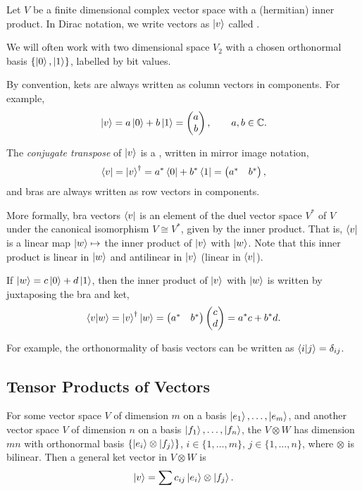 \documentclass[a4paper]{article}
\begin{document}
Let $V$ be a finite dimensional complex vector space with a (hermitian) inner product. In Dirac notation, we write vectors as 
$\ket{v}$ called . 

We will often work with two dimensional space $V_2$ with a chosen orthonormal basis $\{\ket{0}, \ket{1}\}$, labelled by bit values.

By convention, kets are always written as column vectors in components. For example,
$$
\ket{v} = a \ket{0} + b\ket{1} = \begin{pmatrix}
	a \\ b
\end{pmatrix}, \quad \quad a, b\in \mathbb{C}.
$$

The \emph{conjugate transpose} of $\ket{v}$ is a , written in mirror image notation, 
$$
\bra{v} = \ket{v}^{\dagger} = a^* \bra{0} + b^* \bra{1} = \begin{pmatrix}
	a^* & b^*
\end{pmatrix},
$$
and bras are always written as row vectors in components.

More formally, bra vectors $\bra{v}$ is an element of the duel vector space $V^*$ of $V$ under the canonical isomorphism $V \cong V^*$, given by the inner product. That is, $\bra{v}$ is a linear map $\ket{w} \mapsto$ the inner product of $\ket{v}$ with $\ket{w}$.
Note that this inner product is linear in $\ket{w}$ and antilinear in $\ket{v}$ (linear in $\bra{v}$).

If $\ket{w} = c \ket{0} + d\ket{1}$, then the inner product of $\ket{v}$ with $\ket{w}$ is written by juxtaposing the bra and ket, 
$$
\ip{v}{w} = \ket{v}^{\dagger} \ket{w} = \begin{pmatrix}
	a^* & b^*
\end{pmatrix} \begin{pmatrix}
	c \\ d
\end{pmatrix} = a^* c + b^* d.
$$

For example, the orthonormality of basis vectors can be written as $\ip{i}{j} = \delta_{ij}$.

\subsection{Tensor Products of Vectors}

For some vector space $V$ of dimension $m$ on a basis $\ket{e_1}, \dots, \ket{e_m}$, and another vector space $V$ of dimension $n$ on a basis $\ket{f_1}, \dots, \ket{f_n}$, the  $V \otimes W$ has dimension $mn$ with orthonormal basis $\{ \ket{e_i} \otimes \ket{f_j} \}$, $i \in \{1, \dots, m\}$, $j \in \{1, \dots, n\}$, where $\otimes$ is bilinear.
Then a general ket vector in $V \otimes W$ is
$$
\ket{v} = \sum c_{ij} \ket{e_i} \otimes \ket{f_j}.
$$
\end{document}
